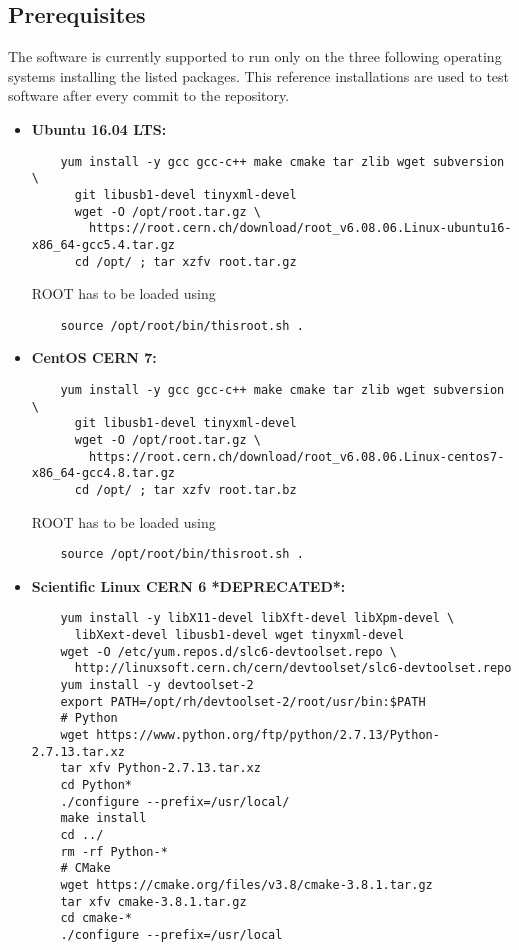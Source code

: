 \documentclass{article}
\begin{document}
\subsection{Prerequisites}
The software is currently supported to run only on the three following operating systems installing the listed packages. This reference installations are used to test software after every commit to the repository.
\begin{itemize}
\item \textbf{Ubuntu 16.04 LTS:}
  \begin{lstlisting}
    yum install -y gcc gcc-c++ make cmake tar zlib wget subversion \
      git libusb1-devel tinyxml-devel
      wget -O /opt/root.tar.gz \
        https://root.cern.ch/download/root_v6.08.06.Linux-ubuntu16-x86_64-gcc5.4.tar.gz
      cd /opt/ ; tar xzfv root.tar.gz
  \end{lstlisting}
  ROOT has to be loaded using
  \begin{lstlisting}
    source /opt/root/bin/thisroot.sh .
  \end{lstlisting}
  \newpage
\item \textbf{CentOS CERN 7:}
  \begin{lstlisting}
    yum install -y gcc gcc-c++ make cmake tar zlib wget subversion \
      git libusb1-devel tinyxml-devel
      wget -O /opt/root.tar.gz \
        https://root.cern.ch/download/root_v6.08.06.Linux-centos7-x86_64-gcc4.8.tar.gz
      cd /opt/ ; tar xzfv root.tar.bz
  \end{lstlisting}
  ROOT has to be loaded using
  \begin{lstlisting}
    source /opt/root/bin/thisroot.sh .
  \end{lstlisting}
\item \textbf{Scientific Linux CERN 6 *DEPRECATED*:}
  \begin{lstlisting}
    yum install -y libX11-devel libXft-devel libXpm-devel \
      libXext-devel libusb1-devel wget tinyxml-devel
    wget -O /etc/yum.repos.d/slc6-devtoolset.repo \
      http://linuxsoft.cern.ch/cern/devtoolset/slc6-devtoolset.repo
    yum install -y devtoolset-2
    export PATH=/opt/rh/devtoolset-2/root/usr/bin:$PATH
    # Python
    wget https://www.python.org/ftp/python/2.7.13/Python-2.7.13.tar.xz
    tar xfv Python-2.7.13.tar.xz
    cd Python*
    ./configure --prefix=/usr/local/
    make install
    cd ../
    rm -rf Python-*
    # CMake
    wget https://cmake.org/files/v3.8/cmake-3.8.1.tar.gz
    tar xfv cmake-3.8.1.tar.gz
    cd cmake-*
    ./configure --prefix=/usr/local

\end{lstlisting}
\end{itemize}
\end{document}
